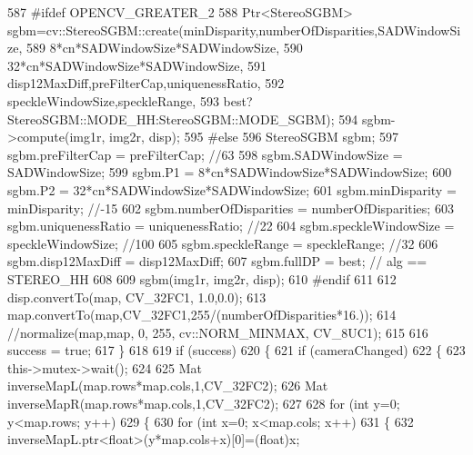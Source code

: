 \begin{DoxyCode}
587 \textcolor{preprocessor}{    #ifdef OPENCV\_GREATER\_2}
588         Ptr<StereoSGBM> sgbm=cv::StereoSGBM::create(minDisparity,numberOfDisparities,SADWindowSize,
589                                                     8*cn*SADWindowSize*SADWindowSize,
590                                                     32*cn*SADWindowSize*SADWindowSize,
591                                                     disp12MaxDiff,preFilterCap,uniquenessRatio,
592                                                     speckleWindowSize,speckleRange,
593                                                     best?StereoSGBM::MODE\_HH:StereoSGBM::MODE\_SGBM);
594         sgbm->compute(img1r, img2r, disp);
595 \textcolor{preprocessor}{    #else}
596         StereoSGBM sgbm;
597         sgbm.preFilterCap =         preFilterCap; \textcolor{comment}{//63}
598         sgbm.SADWindowSize =        SADWindowSize;        
599         sgbm.P1 =                   8*cn*SADWindowSize*SADWindowSize;
600         sgbm.P2 =                   32*cn*SADWindowSize*SADWindowSize;
601         sgbm.minDisparity =         minDisparity; \textcolor{comment}{//-15}
602         sgbm.numberOfDisparities =  numberOfDisparities;
603         sgbm.uniquenessRatio =      uniquenessRatio; \textcolor{comment}{//22}
604         sgbm.speckleWindowSize =    speckleWindowSize; \textcolor{comment}{//100}
605         sgbm.speckleRange =         speckleRange; \textcolor{comment}{//32}
606         sgbm.disp12MaxDiff =        disp12MaxDiff;
607         sgbm.fullDP =               best; \textcolor{comment}{// alg == STEREO\_HH}
608 
609         sgbm(img1r, img2r, disp);
610 \textcolor{preprocessor}{    #endif}
611 
612         disp.convertTo(map, CV\_32FC1, 1.0,0.0);
613         map.convertTo(map,CV\_32FC1,255/(numberOfDisparities*16.));
614         \textcolor{comment}{//normalize(map,map, 0, 255, cv::NORM\_MINMAX, CV\_8UC1);}
615 
616         success = \textcolor{keyword}{true};
617     \}
618 
619     \textcolor{keywordflow}{if} (success)
620     \{
621         \textcolor{keywordflow}{if} (cameraChanged)
622         \{
623             this->mutex->wait();
624 
625             Mat inverseMapL(map.rows*map.cols,1,CV\_32FC2);
626             Mat inverseMapR(map.rows*map.cols,1,CV\_32FC2);
627 
628             \textcolor{keywordflow}{for} (\textcolor{keywordtype}{int} y=0; y<map.rows; y++)
629             \{
630                 \textcolor{keywordflow}{for} (\textcolor{keywordtype}{int} x=0; x<map.cols; x++)
631                 \{
632                     inverseMapL.ptr<\textcolor{keywordtype}{float}>(y*map.cols+x)[0]=(\textcolor{keywordtype}{float})x;

\end{DoxyCode}
